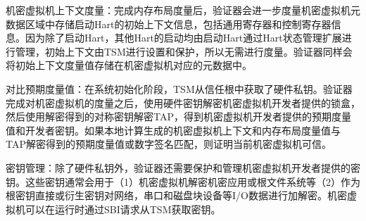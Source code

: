 \documentclass[master, vlined, review]{DissertUESTC}
\begin{document}
	机密虚拟机上下文度量：完成内存布局度量后，验证器会进一步度量机密虚拟机元数据区域中存储启动Hart的初始上下文信息，包括通用寄存器和控制寄存器信息。因为除了启动Hart，其他Hart的启动均由启动Hart通过Hart状态管理扩展进行管理，初始上下文由TSM进行设置和保护，所以无需进行度量。验证器同样会将初始上下文度量值存储在机密虚拟机对应的元数据中。
	
	对比预期度量值：在系统初始化阶段，TSM从信任根中获取了硬件私钥。验证器完成对机密虚拟机的度量之后，使用硬件密钥解密机密虚拟机开发者提供的锁盒，然后使用解密得到的对称密钥解密TAP，得到机密虚拟机开发者提供的预期度量值和开发者密钥。如果本地计算生成的机密虚拟机上下文和内存布局度量值与TAP解密得到的预期度量值或数字签名匹配，则证明当前机密虚拟机可信。
	
	密钥管理：除了硬件私钥外，验证器还需要保护和管理机密虚拟机开发者提供的密钥。这些密钥通常会用于（1）机密虚拟机解密机密应用或根文件系统等（2）作为根密钥直接或衍生密钥对网络，串口和磁盘块设备等I/O数据进行加解密。机密虚拟机可以在运行时通过SBI请求从TSM获取密钥。
	
\end{document}
